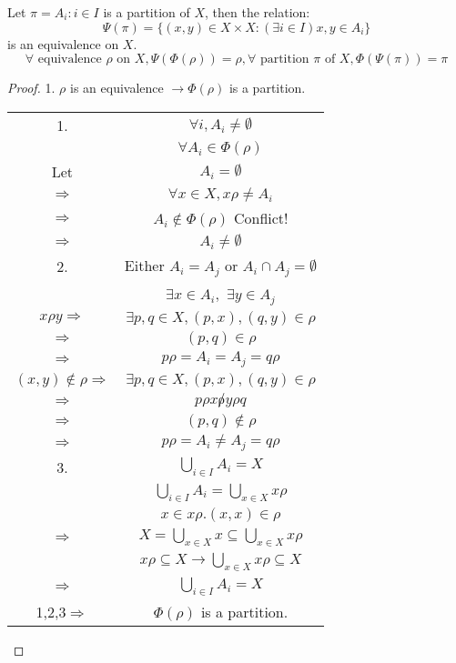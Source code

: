 \begin{Prop}
    Let $\pi = {A_i: i\in I}$ is a partition of $X$, then the relation:
    \[
        \Psi(\pi) = \{(x,y)\in X\times X:(\exists i\in I)x,y\in A_i\}
    \]
    is an equivalence on $X$.
    \[\forall\text{ equivalence } \rho  \text{ on } X, \Psi(\Phi(\rho ))=\rho, \forall \text{ partition } \pi \text{ of } X, \Phi(\Psi(\pi))=\pi\]
    \begin{proof} 
        1. $\rho$ is an equivalence $\to \Phi(\rho)$ is a partition. 
        \begin{center}
            \begin{tabular}{c c}
                1. & $\forall i, A_i \neq \emptyset$    \\
                & $\forall A_i \in \Phi(\rho)$    \\
                Let & $A_i = \emptyset$    \\
                $\Rightarrow$ & $\forall x\in X, x\rho \neq A_i$  \\
                $\Rightarrow$ & $A_i \notin \Phi(\rho)$ Conflict!  \\
                $\Rightarrow$ & $A_i \neq \emptyset $ \\
                2. & Either $A_i = A_j $ or $ A_i \cap A_j = \emptyset$   \\
                & $\exists x \in A_i,$ $\exists y \in A_j$  \\
                $x\rho y\Rightarrow$ & $\exists p,q \in X, (p, x), (q,y) \in \rho$  \\
                $\Rightarrow$ & $(p, q) \in \rho$    \\
                $\Rightarrow$ & $p\rho = A_i = A_j = q\rho$ \\
                $(x,y)\notin \rho\Rightarrow$ & $\exists p,q\in X, (p, x),(q, y)\in \rho$    \\
                $\Rightarrow$ & $p\rho x\not\rho y \rho q$ \\
                $\Rightarrow$ & $(p, q)\notin \rho$  \\
                $\Rightarrow$ & $p\rho = A_i \neq A_j = q\rho$  \\
                3. & $\bigcup_{i\in I} A_i = X$ \\
                & $\bigcup_{i \in I} A_i = \bigcup_{x \in X} x\rho$  \\
                & $x\in x\rho. (x,x)\in \rho$   \\
                $\Rightarrow$ & $X = \bigcup_{x\in X}x \subseteq \bigcup_{x\in X} x\rho$    \\
                & $x\rho \subseteq X \rightarrow \bigcup_{x\in X}x\rho \subseteq X$   \\
                $\Rightarrow$ & $\bigcup_{i\in I} A_i = X$  \\
                1,2,3$\Rightarrow$ & $\Phi(\rho)$ is a partition. 
            \end{tabular}
        \end{center}


\end{proof}
\end{Prop}
